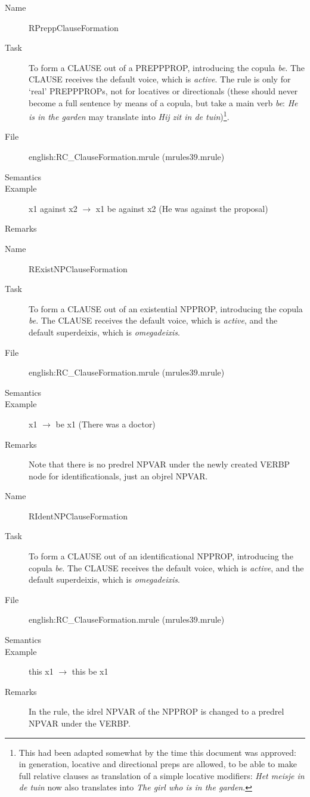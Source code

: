 \begin{description}
\vspace{1 cm}
\begin{description}
\item[Name] RPreppClauseFormation
\item[Task] To form a CLAUSE out of a PREPPPROP, introducing the copula 
{\em be\/}. The CLAUSE receives the default voice, which is {\em active\/}. 
The rule 
is only for `real' PREPPPROPs, not for locatives or directionals (these should 
never become a full sentence by means of a copula, but take a main verb 
{\em be\/}: {\em He is in the garden\/} may translate into 
{\em Hij zit in de tuin\/})\footnote{This had been adapted somewhat by the 
time this document was approved: in generation, locative and directional preps
are allowed, to be able to make full relative clauses as translation of a 
simple locative modifiers: {\em Het meisje in de tuin\/} now also translates 
into {\em The girl who is in the garden\/}. }.
\item[File] english:RC\_ClauseFormation.mrule (mrules39.mrule)
\item[Semantics]
\item[Example] x1 against x2 $\rightarrow$ x1 be against x2 (He was against the 
proposal)
\item[Remarks]
\end{description}


\vspace{1 cm}
\begin{description}
\item[Name]   RExistNPClauseFormation
\item[Task] To form a CLAUSE out of an existential NPPROP, introducing the 
copula {\em be\/}. The CLAUSE receives the default voice, which is 
{\em active\/}, and the default superdeixis, which is {\em omegadeixis\/}.
\item[File] english:RC\_ClauseFormation.mrule (mrules39.mrule)
\item[Semantics]
\item[Example] x1 $\rightarrow$ be x1 (There was a doctor)
\item[Remarks] Note that there is no predrel NPVAR under the newly created 
VERBP node for identificationals, just an objrel NPVAR.
\end{description}


\vspace{1 cm}
\begin{description}
\item[Name] RIdentNPClauseFormation
\item[Task] To form a CLAUSE out of an identificational NPPROP, introducing the 
copula {\em be\/}. The CLAUSE receives the default voice, which is 
{\em active\/}, and the default superdeixis, which is {\em omegadeixis\/}.
\item[File] english:RC\_ClauseFormation.mrule (mrules39.mrule)
\item[Semantics]
\item[Example] this x1 $\rightarrow$ this be x1
\item[Remarks] In the rule, the idrel NPVAR of the NPPROP is changed to a 
predrel NPVAR under the VERBP.
\end{description}


\end{description}
